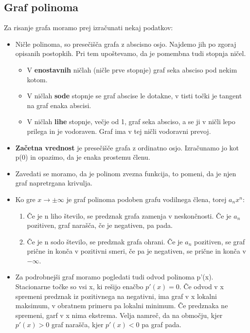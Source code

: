 \subsection{Graf polinoma}
Za risanje grafa moramo prej izračunati nekaj podatkov:
\begin{itemize}
\item Ničle polinoma, so presečišča grafa z abscisno osjo. Najdemo jih po zgoraj opisanih postopkih. Pri tem upoštevamo, da je pomembna tudi stopnja ničel. 
\begin{itemize}
\item V \textbf{enostavnih} ničlah (ničle prve stopnje) graf seka absciso pod nekim kotom.
\item V ničlah \textbf{sode} stopnje se graf abscise le dotakne, v tisti točki je tangent na graf enaka abscisi.
\item V ničlah \textbf{lihe} stopnje, večje od 1, graf seka absciso, a se ji v ničli lepo prilega in je vodoraven. Graf ima v tej ničli vodoravni prevoj.
\end{itemize}
\item \textbf{Začetna vrednost} je presečišče grafa z ordinatno osjo. Izračunamo jo kot p(0) in opazimo, da je enaka prostemu členu.
\item Zavedati se moramo, da je polinom zvezna funkcija, to pomeni, da je njen graf napretrgana krivulja. 
\item Ko gre $x\to \pm \infty$  je graf polinoma podoben grafu vodilnega člena, torej $a_nx^n$:
\begin{enumerate}
\item Če je n liho število, se predznak grafa zamenja v neskončnosti. Če je $a_ n$ pozitiven, graf narašča, če je negativen, pa pada.
\item Če je n sodo število, se predznak grafa ohrani. Če je $a_ n$ pozitiven, se graf prične in konča v pozitivni smeri, če pa je negativen, se prične in konča v $-\infty$.
\end{enumerate}
\item Za podrobnejši graf moramo pogledati tudi odvod polinoma p'(x). Stacionarne točke so vsi x, ki rešijo enačbo $p'(x)=0$. Če odvod v x spremeni predznak iz pozitivnega na negativni, ima graf v x lokalni maksimum, v obratnem primeru pa lokalni minimum. Če predznaka ne spremeni, garf v x nima ekstrema. Velja namreč, da na območju, kjer $p'(x) >0$ graf narašča, kjer $p'(x)<0$ pa graf pada.
\end{itemize}



